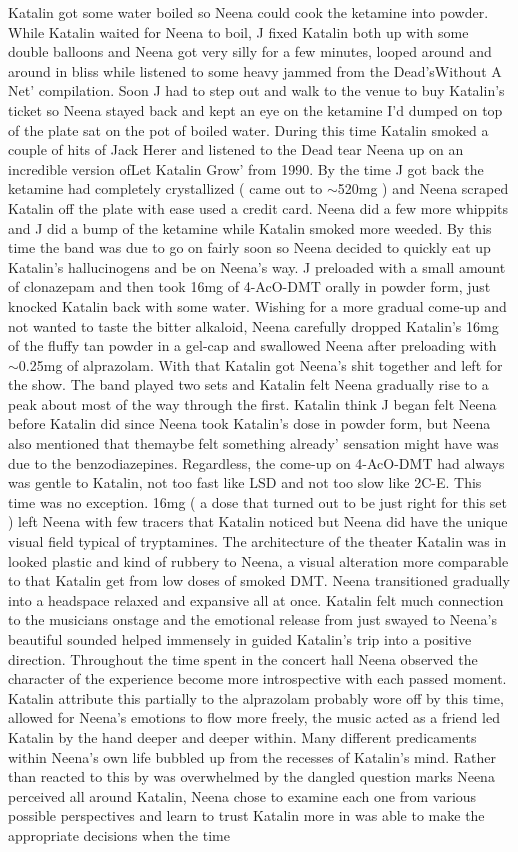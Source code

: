 \documentclass[12pt]{book}
\begin{document}
Katalin got some water boiled so Neena could cook the ketamine into powder. While Katalin waited for Neena to boil, J fixed Katalin both up with some double balloons and Neena got very silly for a few minutes, looped around and around in bliss while listened to some heavy jammed from the Dead'sWithout A Net' compilation. Soon J had to step out and walk to the venue to buy Katalin's ticket so Neena stayed back and kept an eye on the ketamine I'd dumped on top of the plate sat on the pot of boiled water. During this time Katalin smoked a couple of hits of Jack Herer and listened to the Dead tear Neena up on an incredible version ofLet Katalin Grow' from 1990. By the time J got back the ketamine had completely crystallized ( came out to $\sim$520mg ) and Neena scraped Katalin off the plate with ease used a credit card. Neena did a few more whippits and J did a bump of the ketamine while Katalin smoked more weeded. By this time the band was due to go on fairly soon so Neena decided to quickly eat up Katalin's hallucinogens and be on Neena's way. J preloaded with a small amount of clonazepam and then took 16mg of 4-AcO-DMT orally in powder form, just knocked Katalin back with some water. Wishing for a more gradual come-up and not wanted to taste the bitter alkaloid, Neena carefully dropped Katalin's 16mg of the fluffy tan powder in a gel-cap and swallowed Neena after preloading with $\sim$0.25mg of alprazolam. With that Katalin got Neena's shit together and left for the show. The band played two sets and Katalin felt Neena gradually rise to a peak about most of the way through the first. Katalin think J began felt Neena before Katalin did since Neena took Katalin's dose in powder form, but Neena also mentioned that themaybe felt something already' sensation might have was due to the benzodiazepines. Regardless, the come-up on 4-AcO-DMT had always was gentle to Katalin, not too fast like LSD and not too slow like 2C-E. This time was no exception. 16mg ( a dose that turned out to be just right for this set ) left Neena with few tracers that Katalin noticed but Neena did have the unique visual field typical of tryptamines. The architecture of the theater Katalin was in looked plastic and kind of rubbery to Neena, a visual alteration more comparable to that Katalin get from low doses of smoked DMT. Neena transitioned gradually into a headspace relaxed and expansive all at once. Katalin felt much connection to the musicians onstage and the emotional release from just swayed to Neena's beautiful sounded helped immensely in guided Katalin's trip into a positive direction. Throughout the time spent in the concert hall Neena observed the character of the experience become more introspective with each passed moment. Katalin attribute this partially to the alprazolam probably wore off by this time, allowed for Neena's emotions to flow more freely, the music acted as a friend led Katalin by the hand deeper and deeper within. Many different predicaments within Neena's own life bubbled up from the recesses of Katalin's mind. Rather than reacted to this by was overwhelmed by the dangled question marks Neena perceived all around Katalin, Neena chose to examine each one from various possible perspectives and learn to trust Katalin more in was able to make the appropriate decisions when the time 
\end{document}
